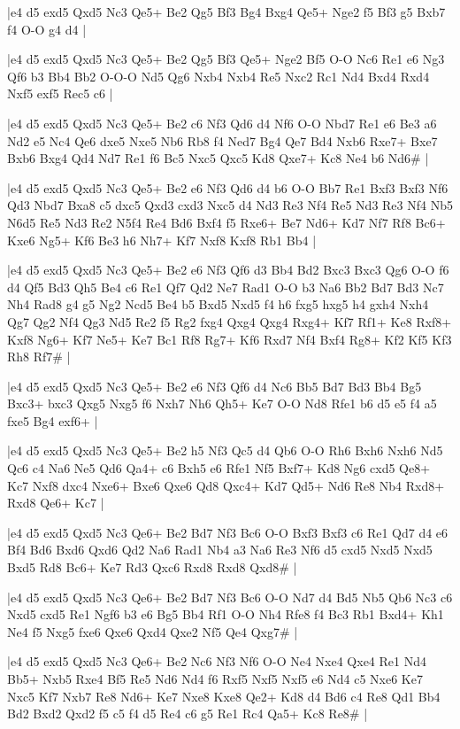 \whitename{}
\blackname{}
\makegametitle
|e4 d5 exd5 Qxd5 Nc3 Qe5+ Be2 Qg5 Bf3 Bg4 Bxg4 Qe5+ Nge2 f5 Bf3 g5 Bxb7 f4 O-O g4 d4  |

\whitename{}
\blackname{}
\makegametitle
|e4 d5 exd5 Qxd5 Nc3 Qe5+ Be2 Qg5 Bf3 Qe5+ Nge2 Bf5 O-O Nc6 Re1 e6 Ng3 Qf6 b3 Bb4 Bb2 O-O-O Nd5 Qg6 Nxb4 Nxb4 Re5 Nxc2 Rc1 Nd4 Bxd4 Rxd4 Nxf5 exf5 Rec5 c6  |

\whitename{}
\blackname{}
\makegametitle
|e4 d5 exd5 Qxd5 Nc3 Qe5+ Be2 c6 Nf3 Qd6 d4 Nf6 O-O Nbd7 Re1 e6 Be3 a6 Nd2 e5 Nc4 Qe6 dxe5 Nxe5 Nb6 Rb8 f4 Ned7 Bg4 Qe7 Bd4 Nxb6 Rxe7+ Bxe7 Bxb6 Bxg4 Qd4 Nd7 Re1 f6 Bc5 Nxc5 Qxc5 Kd8 Qxe7+ Kc8 Ne4 b6 Nd6\#  |

\whitename{}
\blackname{}
\makegametitle
|e4 d5 exd5 Qxd5 Nc3 Qe5+ Be2 e6 Nf3 Qd6 d4 b6 O-O Bb7 Re1 Bxf3 Bxf3 Nf6 Qd3 Nbd7 Bxa8 c5 dxc5 Qxd3 cxd3 Nxc5 d4 Nd3 Re3 Nf4 Re5 Nd3 Re3 Nf4 Nb5 N6d5 Re5 Nd3 Re2 N5f4 Re4 Bd6 Bxf4 f5 Rxe6+ Be7 Nd6+ Kd7 Nf7 Rf8 Bc6+ Kxe6 Ng5+ Kf6 Be3 h6 Nh7+ Kf7 Nxf8 Kxf8 Rb1 Bb4  |

\whitename{}
\blackname{}
\makegametitle
|e4 d5 exd5 Qxd5 Nc3 Qe5+ Be2 e6 Nf3 Qf6 d3 Bb4 Bd2 Bxc3 Bxc3 Qg6 O-O f6 d4 Qf5 Bd3 Qh5 Be4 c6 Re1 Qf7 Qd2 Ne7 Rad1 O-O b3 Na6 Bb2 Bd7 Bd3 Nc7 Nh4 Rad8 g4 g5 Ng2 Ncd5 Be4 b5 Bxd5 Nxd5 f4 h6 fxg5 hxg5 h4 gxh4 Nxh4 Qg7 Qg2 Nf4 Qg3 Nd5 Re2 f5 Rg2 fxg4 Qxg4 Qxg4 Rxg4+ Kf7 Rf1+ Ke8 Rxf8+ Kxf8 Ng6+ Kf7 Ne5+ Ke7 Bc1 Rf8 Rg7+ Kf6 Rxd7 Nf4 Bxf4 Rg8+ Kf2 Kf5 Kf3 Rh8 Rf7\#  |

\whitename{}
\blackname{}
\makegametitle
|e4 d5 exd5 Qxd5 Nc3 Qe5+ Be2 e6 Nf3 Qf6 d4 Nc6 Bb5 Bd7 Bd3 Bb4 Bg5 Bxc3+ bxc3 Qxg5 Nxg5 f6 Nxh7 Nh6 Qh5+ Ke7 O-O Nd8 Rfe1 b6 d5 e5 f4 a5 fxe5 Bg4 exf6+  |

\whitename{}
\blackname{}
\makegametitle
|e4 d5 exd5 Qxd5 Nc3 Qe5+ Be2 h5 Nf3 Qc5 d4 Qb6 O-O Rh6 Bxh6 Nxh6 Nd5 Qc6 c4 Na6 Ne5 Qd6 Qa4+ c6 Bxh5 e6 Rfe1 Nf5 Bxf7+ Kd8 Ng6 cxd5 Qe8+ Kc7 Nxf8 dxc4 Nxe6+ Bxe6 Qxe6 Qd8 Qxc4+ Kd7 Qd5+ Nd6 Re8 Nb4 Rxd8+ Rxd8 Qe6+ Kc7  |

\whitename{}
\blackname{}
\makegametitle
|e4 d5 exd5 Qxd5 Nc3 Qe6+ Be2 Bd7 Nf3 Bc6 O-O Bxf3 Bxf3 c6 Re1 Qd7 d4 e6 Bf4 Bd6 Bxd6 Qxd6 Qd2 Na6 Rad1 Nb4 a3 Na6 Re3 Nf6 d5 cxd5 Nxd5 Nxd5 Bxd5 Rd8 Bc6+ Ke7 Rd3 Qxc6 Rxd8 Rxd8 Qxd8\#  |

\whitename{}
\blackname{}
\makegametitle
|e4 d5 exd5 Qxd5 Nc3 Qe6+ Be2 Bd7 Nf3 Bc6 O-O Nd7 d4 Bd5 Nb5 Qb6 Nc3 c6 Nxd5 cxd5 Re1 Ngf6 b3 e6 Bg5 Bb4 Rf1 O-O Nh4 Rfe8 f4 Bc3 Rb1 Bxd4+ Kh1 Ne4 f5 Nxg5 fxe6 Qxe6 Qxd4 Qxe2 Nf5 Qe4 Qxg7\#  |

\whitename{}
\blackname{}
\makegametitle
|e4 d5 exd5 Qxd5 Nc3 Qe6+ Be2 Nc6 Nf3 Nf6 O-O Ne4 Nxe4 Qxe4 Re1 Nd4 Bb5+ Nxb5 Rxe4 Bf5 Re5 Nd6 Nd4 f6 Rxf5 Nxf5 Nxf5 e6 Nd4 c5 Nxe6 Ke7 Nxc5 Kf7 Nxb7 Re8 Nd6+ Ke7 Nxe8 Kxe8 Qe2+ Kd8 d4 Bd6 c4 Re8 Qd1 Bb4 Bd2 Bxd2 Qxd2 f5 c5 f4 d5 Re4 c6 g5 Re1 Rc4 Qa5+ Kc8 Re8\#  |


